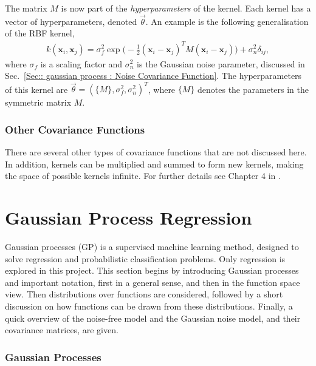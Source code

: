 \documentclass[twoside,english]{uiofysmaster}
\begin{document}
{The matrix $M$ is now part of the \textit{hyperparameters} of the kernel. Each kernel has a vector of hyperparameters, denoted $\vec{\theta}$. An example is the following generalisation of the RBF kernel, 
\begin{align}
k(\textbf{x}_i, \textbf{x}_j) = \sigma_f^2 \exp \big(- \frac{1}{2} (\textbf{x}_i - \textbf{x}_j)^T M (\textbf{x}_i - \textbf{x}_j) \big) + \sigma_n^2 \delta_{ij},
\end{align}
where $\sigma_f$ is a scaling factor and $\sigma_n^2$ is the Gaussian noise parameter, discussed in Sec.~\ref{Sec:: gaussian process : Noise Covariance Function}. The hyperparameters of this kernel are $\vec{\theta} = (\{M\}, \sigma^2_f, \sigma_n^2)^T$, where $\{M\}$ denotes the parameters in the symmetric matrix $M$. 

\subsubsection{Other Covariance Functions}

There are several other types of covariance functions that are not discussed here. In addition, kernels can be multiplied and summed to form new kernels, making the space of possible kernels infinite. For further details see Chapter 4 in \cite{rasmussen2006gaussian}.




\section{Gaussian Process Regression}\label{Sec: gaussian process : Gaussian Process Regression}

Gaussian processes (GP) is a supervised machine learning method, designed to solve regression and probabilistic classification problems. Only regression is explored in this project. This section begins by introducing Gaussian processes and important notation, first in a general sense, and then in the function space view. Then distributions over functions are considered, followed by a short discussion on how functions can be drawn from these distributions. Finally, a quick overview of the noise-free model and the Gaussian noise model, and their covariance matrices, are given.

\subsubsection{Gaussian Processes}\label{Sec:: gaussian process : Gaussian Processes}

}
\end{document}
